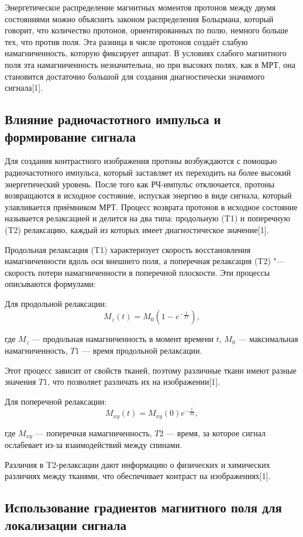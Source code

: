 Энергетическое распределение магнитных моментов протонов между двумя состояниями можно объяснить законом распределения Больцмана, который говорит, что количество протонов, ориентированных по полю, немного больше тех, что против поля. Эта разница в числе протонов создаёт слабую намагниченность, которую фиксирует аппарат. В условиях слабого магнитного поля эта намагниченность незначительна, но при высоких полях, как в МРТ, она становится достаточно большой для создания диагностически значимого сигнала[1].

\subsection{Влияние радиочастотного импульса и формирование сигнала}

Для создания контрастного изображения протоны возбуждаются с помощью радиочастотного импульса, который заставляет их переходить на более высокий энергетический уровень. После того как РЧ-импульс отключается, протоны возвращаются в исходное состояние, испуская энергию в виде сигнала, который улавливается приёмником МРТ. Процесс возврата протонов в исходное состояние называется релаксацией и делится на два типа: продольную (T1) и поперечную (T2) релаксацию, каждый из которых имеет диагностическое значение[1].

Продольная релаксация (T1) характеризует скорость восстановления намагниченности вдоль оси внешнего поля, а поперечная релаксация (T2) "--- скорость потери намагниченности в поперечной плоскости. Эти процессы описываются формулами:

Для продольной релаксации:
\[
M_z(t) = M_0 \left(1 - e^{-\frac{t}{T1}}\right),
\]

где \(M_z\) — продольная намагниченность в момент времени \(t\), \(M_0\) — максимальная намагниченность, \(T1\) — время продольной релаксации. 

Этот процесс зависит от свойств тканей, поэтому различные ткани имеют разные значения \(T1\), что позволяет различать их на изображении[1].

Для поперечной релаксации:
\[
M_{xy}(t) = M_{xy}(0) e^{-\frac{t}{T2}},
\]

где \(M_{xy}\) — поперечная намагниченность, \(T2\) — время, за которое сигнал ослабевает из-за взаимодействий между спинами. 

Различия в T2-релаксации дают информацию о физических и химических различиях между тканями, что обеспечивает контраст на изображениях[1].

\subsection{Использование градиентов магнитного поля для локализации сигнала}


